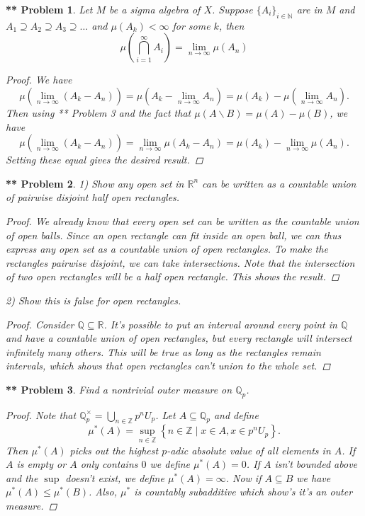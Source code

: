 \documentclass{article}
\newtheorem{**}{** Problem}
\begin{document}
\begin{flushleft}
\begin{**}
Let $M$ be a sigma algebra of $X$. Suppose $\{A_i\}_{i \in \mathbb{N}}$ are in $M$ and $A_1 \supseteq A_2 \supseteq A_3 \supseteq \dots$ and $\mu (A_k) < \infty$ for some $k$, then
\[
\mu \left (\bigcap_{i=1}^{\infty} A_i \right ) = \lim_{n \rightarrow \infty} \mu (A_n)
\]
\begin{proof}
We have
\[
\mu \left (\lim_{n \rightarrow \infty} (A_k - A_n) \right ) = \mu \left (A_k - \lim_{n \rightarrow \infty} A_n \right ) = \mu (A_k) - \mu \left (\lim_{n \rightarrow \infty} A_n \right ).
\]
Then using ** Problem 3 and the fact that $\mu (A \backslash B) = \mu (A) - \mu (B)$, we have
\[
\mu \left (\lim_{n \rightarrow \infty} (A_k - A_n) \right ) = \lim_{n \rightarrow \infty} \mu \left (A_k - A_n \right ) = \mu (A_k) - \lim_{n \rightarrow \infty} \mu (A_n).
\]
Setting these equal gives the desired result.
\end{proof}
\end{**}

\begin{**}
1) Show any open set in $\mathbb{R}^n$ can be written as a countable union of pairwise disjoint half open rectangles.
\begin{proof}
We already know that every open set can be written as the countable union of open balls. Since an open rectangle can fit inside an open ball, we can thus express any open set as a countable union of open rectangles. To make the rectangles pairwise disjoint, we can take intersections. Note that the intersection of two open rectangles will be a half open rectangle. This shows the result.
\end{proof}

2) Show this is false for open rectangles.
\begin{proof}
Consider $\mathbb{Q} \subseteq \mathbb{R}$. It's possible to put an interval around every point in $\mathbb{Q}$ and have a countable union of open rectangles, but every rectangle will intersect infinitely many others. This will be true as long as the rectangles remain intervals, which shows that open rectangles can't union to the whole set.
\end{proof}
\end{**}


\begin{**}
Find a nontrivial outer measure on $\mathbb{Q}_p$.
\begin{proof}
Note that $\mathbb{Q}_p^{\times} = \bigcup_{n \in \mathbb{Z}} p^n U_p$. Let $A \subseteq \mathbb{Q}_p$ and define
\[
\mu^*(A) = \sup_{n \in \mathbb{Z}} \left \{n \in \mathbb{Z} \mid x \in A, x \in p^n U_p \right \}.
\]
Then $\mu^*(A)$ picks out the highest $p$-adic absolute value of all elements in $A$. If $A$ is empty or $A$ only contains $0$ we define $\mu^*(A) = 0$. If $A$ isn't bounded above and the $\sup$ doesn't exist, we define $\mu^*(A) = \infty$. Now if $A \subseteq B$ we have $\mu^*(A) \leq \mu^*(B)$. Also, $\mu^*$ is countably subadditive which show's it's an outer measure.
\end{proof}
\end{**}


\end{flushleft}
\end{document}
